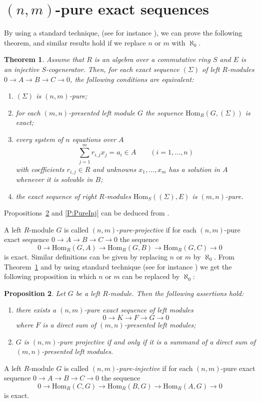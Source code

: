 \documentclass{amsart}
\newtheorem{theorem}{Theorem}[section]
\newtheorem{proposition}[theorem]{Proposition}
\begin{document}
\section{$(n,m)$-pure exact sequences}
\label{S:pure} 

By using a standard technique, (see for instance \cite[Chapter I, Section 8]{FuSa01}), we can prove the following theorem, and similar results hold if we replace $n$ or $m$ with $\aleph_0$.
\begin{theorem}
\label{T:pure} Assume that $R$ is an algebra over a commutative ring $S$ and $E$ is an injective $S$-cogenerator. Then, for each exact sequence $(\Sigma)$ of left $R$-modules $0\rightarrow A\rightarrow B\rightarrow C\rightarrow 0$, the following conditions are equivalent:
\begin{enumerate}
\item $(\Sigma)$ is $(n,m)$-pure;
\item  for each $(m,n)$-presented left module $G$ the sequence $\mathrm{Hom}_R(G,(\Sigma))$ is exact;
\item every system of $n$ equations over $A$
\[\sum_{j=1}^{m}r_{i,j}x_j=a_i\in A\qquad (i=1,\dots,n)\]
with coefficients $r_{i,j}\in R$ and unknowns $x_1,\dots,x_m$ has a solution in $A$ whenever it is solvable in $B$;
\item the exact sequence of right $R$-modules $\mathrm{Hom}_S((\Sigma),E)$ is $(m,n)$-pure.
\end{enumerate}
\end{theorem}

 Propositions~\ref{P:PureProj} and \ref{P:PureInj} can be deduced from \cite[Theorem 1]{Warf69}.

A left $R$-module $G$ is called $(n,m)$-{\it pure-projective} if for each $(n,m)$-pure  exact sequence $0\rightarrow A\rightarrow B\rightarrow C\rightarrow 0$ the sequence
\[0\rightarrow \mathrm{Hom}_R(G,A)\rightarrow \mathrm{Hom}_R(G,B)\rightarrow \mathrm{Hom}_R(G,C)\rightarrow 0\]
is exact. Similar definitions can be given by replacing $n$ or $m$ by $\aleph_0$. From Theorem~\ref{T:pure} and by using standard technique (see for instance \cite[Chapter VI, Section 12]{FuSa01}) we get the following proposition in which $n$ or $m$ can be replaced by $\aleph_0$:
\begin{proposition}
\label{P:PureProj} Let $G$ be a left $R$-module. Then the following assertions hold:
\begin{enumerate}
\item there exists a $(n,m)$-pure exact sequence of left modules \[0\rightarrow K\rightarrow F\rightarrow G\rightarrow 0\] where $F$ is a direct sum of $(m,n)$-presented left modules;
\item $G$ is $(n,m)$-pure projective if and only if it is a summand of a direct sum of $(m,n)$-presented left modules.
\end{enumerate}
\end{proposition}
A left $R$-module $G$ is called $(n,m)$-{\it pure-injective} if for each $(n,m)$-pure  exact sequence $0\rightarrow A\rightarrow B\rightarrow C\rightarrow 0$ the sequence
\[0\rightarrow \mathrm{Hom}_R(C,G)\rightarrow \mathrm{Hom}_R(B,G)\rightarrow \mathrm{Hom}_R(A,G)\rightarrow 0\]
is exact. 
\end{document}
